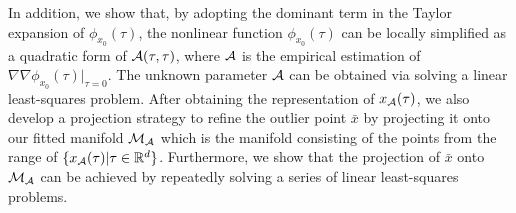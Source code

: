 \documentclass{article}
\theoremstyle{remark}
\begin{document}
In addition, we show that, by adopting the dominant term in the Taylor expansion of $\phi_{x_0}(\tau)$,  the nonlinear function $\phi_{x_0}(\tau)$ can be locally simplified as a quadratic form of ${\cal A}(\tau,\tau)$, where $\cal A$ is the empirical estimation of $\nabla\nabla \phi_{x_0}(\tau)|_{\tau=0}$. The unknown parameter $\cal A$ can be obtained via solving a linear least-squares problem. After obtaining the representation of $x_{\cal A}(\tau)$, we also develop a projection strategy to refine the outlier point $\bar{x}$ by projecting it onto our fitted manifold ${\cal M_A}$ which is the manifold consisting of the points from the range of $\{x_{\cal A}(\tau)|\tau\in {\mathbb R}^d\}$. Furthermore, we show that the projection of $\bar{x}$ onto $\cal M_A$ can be achieved by repeatedly solving a series of linear least-squares problems.
%
\end{document}
